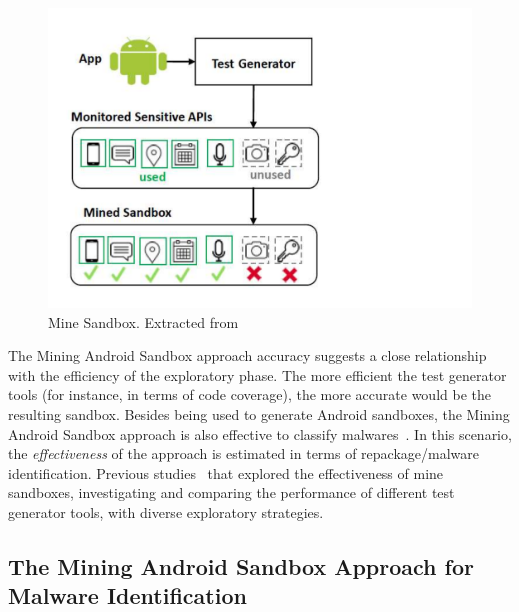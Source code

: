 \begin{figure}[ht]
\centering
\includegraphics[scale=0.30]{images/mineSandbox.pdf}
\caption{Mine Sandbox. Extracted from~\cite{DBLP:conf/wcre/BaoLL18}}
 \label{fig:mineSandbox}
\end{figure}

The Mining Android Sandbox approach accuracy suggests a close relationship with the
efficiency of the exploratory phase. The more efficient the test generator
tools (for instance, in terms of code coverage), the more accurate would be the resulting
sandbox. Besides being used to generate Android sandboxes, the Mining Android Sandbox approach is also effective 
to classify malwares~\cite{DBLP:conf/wcre/BaoLL18}.  In this scenario, the \emph{effectiveness} of the approach
is estimated in terms of repackage/malware identification.
Previous studies~\cite{DBLP:conf/wcre/BaoLL18,DBLP:conf/scam/CostaMCMVBC20} that explored the effectiveness of mine sandboxes,
investigating and comparing the performance of different test generator tools,
with diverse exploratory strategies.

\subsection{The Mining Android Sandbox Approach for Malware Identification}


